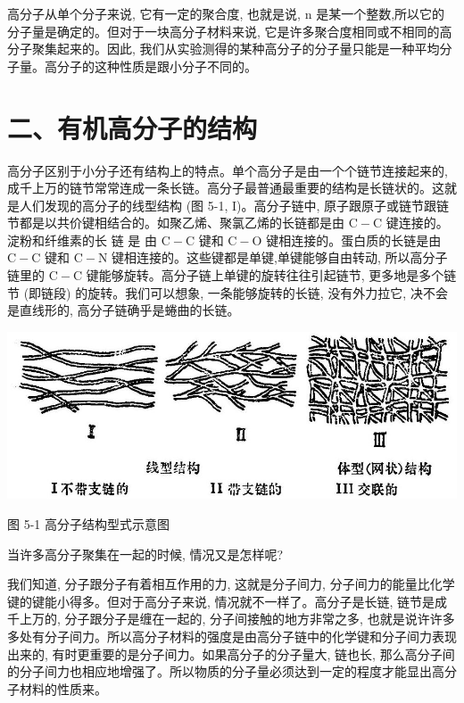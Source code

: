 \documentclass[10pt]{article}
\begin{document}
高分子从单个分子来说, 它有一定的聚合度, 也就是说, \(\mathrm{n}\) 是某一个整数,所以它的分子量是确定的。但对于一块高分子材料来说, 它是许多聚合度相同或不相同的高分子聚集起来的。因此, 我们从实验测得的某种高分子的分子量只能是一种平均分子量。高分子的这种性质是跟小分子不同的。

\section*{二、有机高分子的结构}

高分子区别于小分子还有结构上的特点。单个高分子是由一个个链节连接起来的, 成千上万的链节常常连成一条长链。高分子最普通最重要的结构是长链状的。这就是人们发现的高分子的线型结构 (图 5-1, I)。高分子链中, 原子跟原子或链节跟链节都是以共价键相结合的。如聚乙烯、聚氯乙烯的长链都是由 \(\mathrm{C} - \mathrm{C}\) 键连接的。淀粉和纤维素的长 链 是 由 \(\mathrm{C} - \mathrm{C}\) 键和 \(\mathrm{C} - \mathrm{O}\) 键相连接的。蛋白质的长链是由 \(\mathrm{C} - \mathrm{C}\) 键和 \(\mathrm{C} - \mathrm{N}\) 键相连接的。这些键都是单键,单键能够自由转动, 所以高分子链里的 \(\mathrm{C} - \mathrm{C}\) 键能够旋转。高分子链上单键的旋转往往引起链节, 更多地是多个链节 (即链段) 的旋转。我们可以想象, 一条能够旋转的长链, 没有外力拉它, 决不会是直线形的, 高分子链确乎是蜷曲的长链。

\begin{center}
\includegraphics[max width=1.0\textwidth]{images/01912d16-be99-77bb-9535-4f3ed8d9946f_181_902040.jpg}
\end{center}

图 5-1 高分子结构型式示意图

当许多高分子聚集在一起的时候, 情况又是怎样呢?

我们知道, 分子跟分子有着相互作用的力, 这就是分子间力, 分子间力的能量比化学键的键能小得多。但对于高分子来说, 情况就不一样了。高分子是长链, 链节是成千上万的, 分子跟分子是缠在一起的, 分子间接触的地方非常之多, 也就是说许许多多处有分子间力。所以高分子材料的强度是由高分子链中的化学键和分子间力表现出来的, 有时更重要的是分子间力。如果高分子的分子量大, 链也长, 那么高分子间的分子间力也相应地增强了。所以物质的分子量必须达到一定的程度才能显出高分子材料的性质来。
\end{document}
